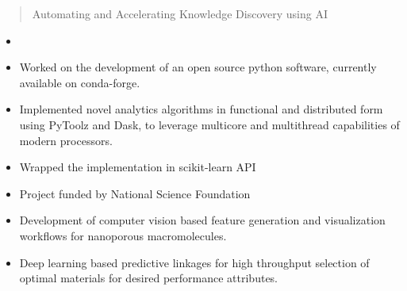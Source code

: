 \documentclass[10pt,a4paper]{altacv}
\begin{document}

\begin{fullwidth}
\makecvheader
\end{fullwidth}


\begin{quote}
Automating and Accelerating Knowledge Discovery using AI
\end{quote}


\begin{itemize}
\item {}
\item Worked on the development of an open source python software,
currently available on conda-forge.
\item Implemented novel analytics algorithms in functional
and distributed form using PyToolz and Dask, to leverage multicore and
multithread capabilities of modern processors.
\item Wrapped the implementation in scikit-learn API
\end{itemize}
\divider

\begin{itemize}
\item Project funded by National Science Foundation
\item Development of computer vision based feature generation and visualization workflows for nanoporous
macromolecules.
\item Deep learning based predictive linkages for high throughput selection of optimal materials for
desired performance attributes.
\end{itemize}
\divider
\end{document}
